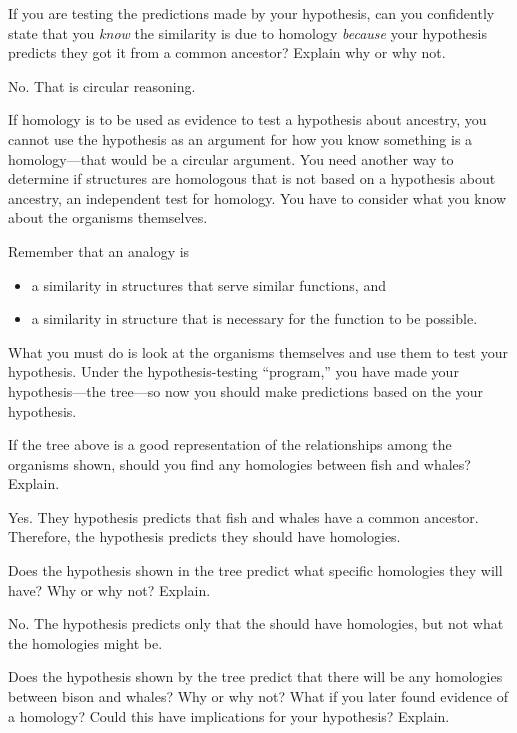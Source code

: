 \documentclass[12pt, addpoints, hidelinks]{exam}
\newcommand*\AnswerBox[2]{%
    \parbox[t][#1]{0.92\textwidth}{%
    \begin{solution}#2\end{solution}}
}
\begin{document}
\begin{questions}


\question[1]
If you are testing the predictions made by your hypothesis,
can you confidently state that you \emph{know} the similarity is due to
homology \emph{because} your hypothesis predicts they got it from a
common ancestor? Explain why or why not.

\AnswerBox{3\baselineskip}{No. That is circular reasoning. }

If homology is to be used as evidence to test a hypothesis about
ancestry, you cannot use the hypothesis as an argument for how you know
something is a homology---that would be a circular argument. You need another 
way to determine if structures are homologous that is not based on a 
hypothesis about ancestry, an independent test for homology. You 
have to consider what you know about the
organisms themselves. 

Remember that an analogy is

\begin{itemize}
\item
  a similarity in structures that serve similar functions, and
\item
  a similarity in structure that is necessary for the function
  to be possible.
\end{itemize}

What you must do is look at the organisms themselves and use them to
test your hypothesis. Under the hypothesis-testing ``program,'' you have made
your hypothesis---the tree---so now you should
make predictions based on the your hypothesis.

\question[1]
If the tree above is a good representation of the
relationships among the organisms shown, should you find any homologies
between fish and whales? Explain.

\AnswerBox{4\baselineskip}{Yes. They hypothesis predicts that fish and whales
have a common ancestor. Therefore, the hypothesis predicts they should have homologies.}

\question[1]
Does the hypothesis shown in the tree predict what specific
homologies they will have? Why or why not? Explain.

\AnswerBox{4\baselineskip}{No. The hypothesis predicts only that the should
have homologies, but not what the homologies might be.}

\question[1]
Does the hypothesis shown by the tree predict that there
will be any homologies between bison and whales? Why or why not? What
if you later found evidence of a homology? Could this have implications
for your hypothesis? Explain.


\end{questions}
\end{document}
